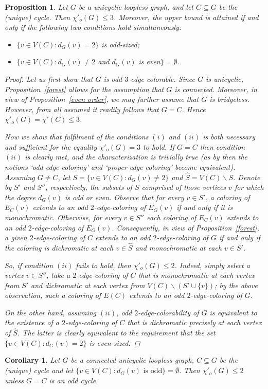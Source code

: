 \documentclass[a4paper,12pt]{article}
\newtheorem{corollary}[theorem]{Corollary}
\newtheorem{proposition}[theorem]{Proposition}
\numberwithin{equation}{section}
\begin{document}
\begin{proposition}
Let $G$ be a unicyclic loopless graph, and let $C\subseteq G$ be the (unique) cycle. Then $\chi'_o(G)\leq3$. Moreover, the upper bound is attained if and only if the following two conditions hold simultaneously:
\begin{itemize}
\item[$(i)$] $\{v\in V(C):d_G(v)=2\}$ is odd-sized;
\item[$(ii)$] $\{v\in V(C):d_G(v)\neq2$ and $d_G(v)$ is even$\}=\emptyset$.
\end{itemize}
\begin{proof}
Let us first show that $G$ is odd $3$-edge-colorable. Since $G$ is unicyclic, Proposition~\ref{forest} allows for the assumption that $G$ is connected. Moreover, in view of Proposition~\ref{even order}, we may further assume that $G$ is bridgeless. However, from all assumed it readily follows that $G=C$. Hence $\chi'_o(G)=\chi'(C)\leq3$.

Now we show that fulfilment of the conditions $(i)$ and $(ii)$ is both necessary and sufficient for the equality $\chi'_o(G)=3$ to hold.
If $G=C$ then condition $(ii)$ is clearly met, and the characterization is trivially true (as by then the notions `odd edge-coloring'  and `proper edge-coloring' become equivalent). Assuming $G\neq C$, let $S=\{v\in V(C):d_G(v)\neq2\}$ and $\hat{S}=V(C)\backslash S$. Denote by $S'$ and $S''$, respectively, the subsets of $S$ comprised of those vertices $v$ for which the degree $d_G(v)$ is odd or even. Observe that for every $v\in S'$, a coloring of $E_C(v)$ extends to an odd $2$-edge-coloring of $E_G(v)$ if and only if it is monochromatic. Otherwise, for every $v\in S''$ each coloring of $E_C(v)$ extends to an odd $2$-edge-coloring of $E_G(v)$. Consequently, in view of Proposition~\ref{forest}, a given $2$-edge-coloring of $C$ extends to an odd $2$-edge-coloring of $G$ if and only if the coloring is dichromatic at each $v\in \hat{S}$ and monochromatic at each $v\in S'$.

So, if condition $(ii)$ fails to hold, then $\chi'_o(G)\leq2$. Indeed, simply select a vertex $v\in S''$, take a $2$-edge-coloring of $C$ that is monochromatic at each vertex from $S'$ and dichromatic at each vertex from  $V(C)\backslash (S'\cup \{v\})$; by the above observation, such a coloring of $E(C)$ extends to an odd $2$-edge-coloring of $G$.

On the other hand, assuming $(ii)$, odd $2$-edge-colorability of $G$ is equivalent to the existence of a $2$-edge-coloring of $C$ that is dichromatic precisely at each vertex of $\hat{S}$. The latter is clearly equivalent to the requirement that the set $\{v\in V(C):d_G(v)=2\}$ is even-sized.
\end{proof}
\end{proposition}
\begin{corollary}
    \label{unicycle}
Let $G$ be a connected unicyclic loopless graph, $C\subseteq G$ be the (unique) cycle and let $\{v\in V(C):d_G(v) \text{ is odd}\}=\emptyset$. Then $\chi'_o(G)\leq2$ unless $G=C$ is an odd cycle.
\end{corollary}
\end{document}
